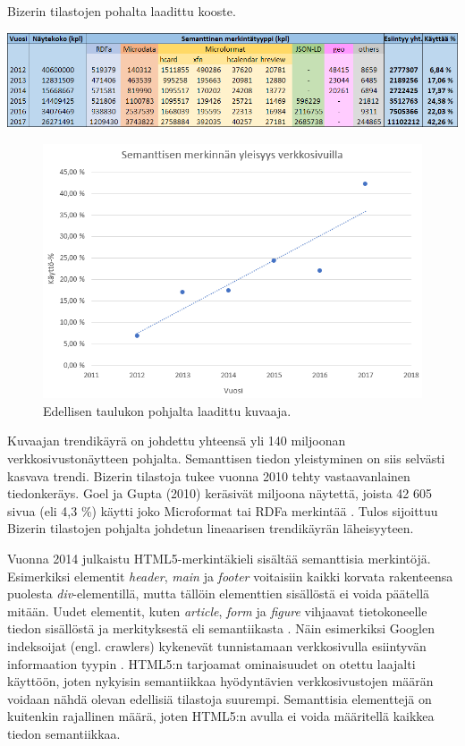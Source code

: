 \documentclass[finnish, 12pt, a4paper, elec, utf8, pdfa, online]{aaltothesis}
\begin{document}
{\begin{table}[htb]
  \centering
  \caption{Bizerin tilastojen pohalta laadittu kooste. \label{images/taulukko2}}
  \includegraphics[width=15cm]{images/taulukko.png}
\end{table}


\begin{figure}[htb]
\centering
\includegraphics[width=13cm]{images/verkkosivut.png}
\caption{Edellisen taulukon pohjalta laadittu kuvaaja. \label{images/verkkosivut}}
\end{figure}

Kuvaajan trendikäyrä on johdettu yhteensä yli 140 miljoonan verkkosivustonäytteen pohjalta. Semanttisen tiedon yleistyminen on siis selvästi kasvava trendi. Bizerin tilastoja tukee vuonna 2010 tehty vastaavanlainen tiedonkeräys. Goel ja Gupta (2010) keräsivät miljoona näytettä, joista 42 605 sivua (eli 4,3 \%) käytti joko Microformat tai RDFa merkintää \cite{Google}. Tulos sijoittuu Bizerin tilastojen pohjalta johdetun lineaarisen trendikäyrän läheisyyteen.

Vuonna 2014 julkaistu HTML5-merkintäkieli sisältää semanttisia merkintöjä. Esimerkiksi elementit \textit{header}, \textit{main} ja \textit{footer} voitaisiin kaikki korvata rakenteensa puolesta \textit{div}-elementillä, mutta tällöin elementtien sisällöstä ei voida päätellä mitään. Uudet elementit, kuten \textit{article}, \textit{form} ja \textit{figure} vihjaavat tietokoneelle tiedon sisällöstä ja merkityksestä eli semantiikasta \cite{html5}. Näin esimerkiksi Googlen indeksoijat (engl. crawlers) kykenevät tunnistamaan verkkosivulla esiintyvän informaation tyypin \cite{html5}. HTML5:n tarjoamat ominaisuudet on otettu laajalti käyttöön, joten nykyisin semantiikkaa hyödyntävien verkkosivustojen määrän voidaan nähdä olevan edellisiä tilastoja suurempi. Semanttisia elementtejä on kuitenkin rajallinen määrä, joten HTML5:n avulla ei voida määritellä kaikkea tiedon semantiikkaa.

}
\end{document}
